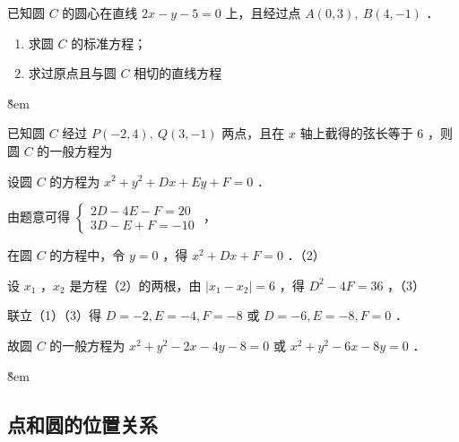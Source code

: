 \begin{example}
    已知圆 $C$ 的圆心在直线 $2 x-y-5=0$ 上，且经过点 $A(0,3), ~ B(4,-1)$ ．
    \begin{enumerate}
        \item 求圆 $C$ 的标准方程；
        \item 求过原点且与圆 $C$ 相切的直线方程
    \end{enumerate}
\end{example}

\v{8em}

\begin{example}
    已知圆 $C$ 经过 $P(-2,4), ~ Q(3,-1)$ 两点，且在 $x$ 轴上截得的弦长等于 6 ，则圆 $C$ 的一般方程为 \underline{\qquad}
\end{example}

\begin{solution}
    设圆 $C$ 的方程为 $x^2+y^2+D x+E y+F=0$ ．

    由题意可得 $\left\{\begin{array}{c}2 D-4 E-F=20 \\ 3 D-E+F=-10\end{array}\right.$ ，

    在圆 $C$ 的方程中，令 $y=0$ ，得 $x^2+D x+F=0$ ．（2）

    设 $x_1$ ，$x_2$ 是方程（2）的两根，由 $\left|x_1-x_2\right|=6$ ，得 $D^2-4 F=36$ ，（3）

    联立（1）（3）得 $D=-2, E=-4, F=-8$ 或 $D=-6, E=-8, F=0$ ．

    故圆 $C$ 的一般方程为 $x^2+y^2-2 x-4 y-8=0$ 或 $x^2+y^2-6 x-8 y=0$ ．
\end{solution}

\v{8em}

\subsection{点和圆的位置关系}

